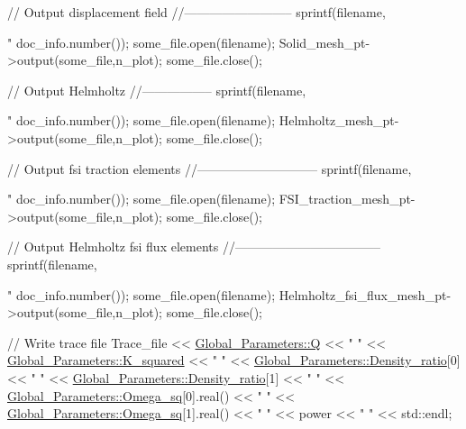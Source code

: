 \begin{DoxyCodeInclude}
{{ \textcolor{comment}{// Output displacement field}
 \textcolor{comment}{//--------------------------}
 sprintf(filename,\textcolor{stringliteral}{"%
         doc\_info.number());
 some\_file.open(filename);
 Solid\_mesh\_pt->output(some\_file,n\_plot);
 some\_file.close();

 \textcolor{comment}{// Output Helmholtz}
 \textcolor{comment}{//-----------------}
 sprintf(filename,\textcolor{stringliteral}{"%
         doc\_info.number());
 some\_file.open(filename);
 Helmholtz\_mesh\_pt->output(some\_file,n\_plot);
 some\_file.close();


 \textcolor{comment}{// Output fsi traction elements}
 \textcolor{comment}{//----------------------------- }
 sprintf(filename,\textcolor{stringliteral}{"%
         doc\_info.number());
 some\_file.open(filename);
 FSI\_traction\_mesh\_pt->output(some\_file,n\_plot);
 some\_file.close();


 \textcolor{comment}{// Output Helmholtz fsi flux elements}
 \textcolor{comment}{//----------------------------------- }
 sprintf(filename,\textcolor{stringliteral}{"%
         doc\_info.number());
 some\_file.open(filename);
 Helmholtz\_fsi\_flux\_mesh\_pt->output(some\_file,n\_plot);
 some\_file.close();

 \textcolor{comment}{// Write trace file}
 Trace\_file << \hyperlink{namespaceGlobal__Parameters_a7814fddf663e56168174a42d2cd6b4c1}{Global\_Parameters::Q} << \textcolor{stringliteral}{" "} 
            << \hyperlink{namespaceGlobal__Parameters_a91a3fa265abaf9e724c668ee800ffb29}{Global\_Parameters::K\_squared} << \textcolor{stringliteral}{" "}
            << \hyperlink{namespaceGlobal__Parameters_a517d4c31b8bce6563c2f605266dd9679}{Global\_Parameters::Density\_ratio}[0] << \textcolor{stringliteral}{" "}
            << \hyperlink{namespaceGlobal__Parameters_a517d4c31b8bce6563c2f605266dd9679}{Global\_Parameters::Density\_ratio}[1] << \textcolor{stringliteral}{" "}
            << \hyperlink{namespaceGlobal__Parameters_a91314f7f1cc80c43543948568f50f405}{Global\_Parameters::Omega\_sq}[0].real() << \textcolor{stringliteral}{" "}
            << \hyperlink{namespaceGlobal__Parameters_a91314f7f1cc80c43543948568f50f405}{Global\_Parameters::Omega\_sq}[1].real() << \textcolor{stringliteral}{" "}
            << power << \textcolor{stringliteral}{" "} 
            << std::endl;
   
}}}}}}
\end{DoxyCodeInclude}
